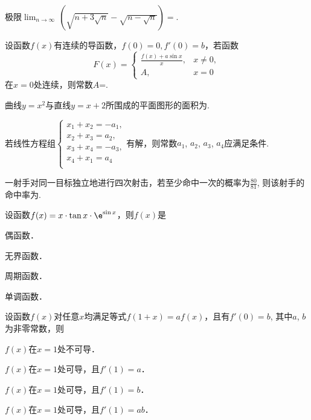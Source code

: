 \documentclass[plain,noanswer,medmath]{../../template/jnuexam}
\begin{document}



\begin{problem}
极限$\lim_{n\to\infty}\,\left(\sqrt{n+3\sqrt{n}}-\sqrt{n-\sqrt{n}}\right)=$\fillin{}.
\end{problem}


\begin{problem}
设函数$f(x)$有连续的导函数，$f(0)=0,f'(0)=b$，若函数
$$F(x)=\begin{cases}
  \frac{f(x)+a\sin x}{x}, & x\ne 0, \\
                       A, & x=0
\end{cases}$$
在$x=0$处连续，则常数$A$=\fillin{}.
\end{problem}


\begin{problem}
曲线$y=x^2$与直线$y=x+2$所围成的平面图形的面积为\fillin{}.
\end{problem}


\begin{problem}
若线性方程组$\begin{cases}
  x_1+x_2=-a_1, \\
  x_2+x_3=a_2, \\
  x_3+x_4=-a_3, \\
  x_4+x_1=a_4 \\
\end{cases}$有解，则常数$a_1$, $a_2$, $a_3$, $a_4$应满足条件\fillin{}.
\end{problem}


\begin{problem}
一射手对同一目标独立地进行四次射击，若至少命中一次的概率为$\frac{80}{81}$,
则该射手的命中率为\fillin{}.
\end{problem}




\begin{problem}
设函数$f(x)=x\cdot \tan x\cdot \e^{\sin x}$，则$f(x)$是\pickout{}
\begin{abcd}
\item 偶函数．
\item 无界函数．
\item 周期函数．
\item 单调函数．
\end{abcd}
\end{problem}


\begin{problem}
设函数$f(x)$对任意$x$均满足等式$f(1+x)=af(x)$，且有$f'(0)=b$,
其中$a$, $b$为非零常数，则\pickout{}
\begin{abcd}
\item $f(x)$在$x=1$处不可导．
\item $f(x)$在$x=1$处可导，且$f'(1)=a$．
\item $f(x)$在$x=1$处可导，且$f'(1)=b$．
\item $f(x)$在$x=1$处可导，且$f'(1)=ab$．
\end{abcd}
\end{problem}
\end{document}
